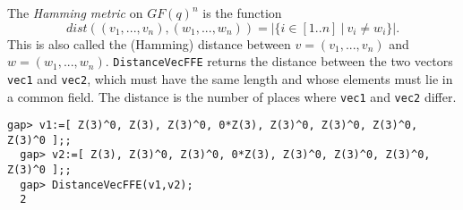 \documentclass[11pt]{report}
\begin{document}
{{{ The \emph{Hamming metric} on $GF(q)^n$ is the function 
\[ dist((v_1,...,v_n),(w_1,...,w_n)) =|\{i\in [1..n]\ |\ v_i\not= w_i\}|. \]
 This is also called the (Hamming) distance between $v=(v_1,...,v_n)$ and $w=(w_1,...,w_n)$. \texttt{DistanceVecFFE} returns the distance between the two vectors \mbox{\texttt{vec1}} and \mbox{\texttt{vec2}}, which must have the same length and whose elements must lie in a common
field. The distance is the number of places where \mbox{\texttt{vec1}} and \mbox{\texttt{vec2}} differ. }

 
\begin{Verbatim}[fontsize=\small,frame=single,label=Example]
  gap> v1:=[ Z(3)^0, Z(3), Z(3)^0, 0*Z(3), Z(3)^0, Z(3)^0, Z(3)^0, Z(3)^0 ];;
  gap> v2:=[ Z(3), Z(3)^0, Z(3)^0, 0*Z(3), Z(3)^0, Z(3)^0, Z(3)^0, Z(3)^0 ];;
  gap> DistanceVecFFE(v1,v2);
  2
\end{Verbatim}
  }

 }

 
\end{document}
